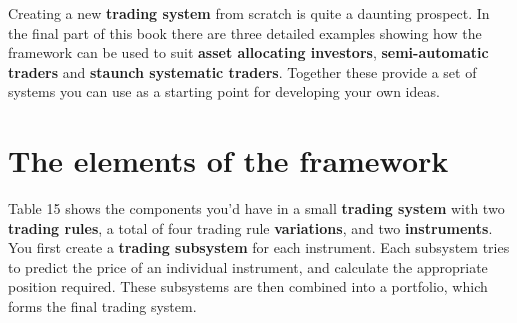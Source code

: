 Creating a new \textbf{trading system} from scratch is quite a daunting prospect. In the final part of this book there are three detailed examples showing how the framework can be used to suit \textbf{asset allocating investors}, \textbf{semi-automatic traders} and \textbf{staunch systematic traders}. Together these provide a set of systems you can use as a starting point for developing your own ideas.

\section*{The elements of the framework}  {}

Table 15 shows the components you'd have in a small \textbf{trading system} with two \textbf{trading rules}, a total of four trading rule \textbf{variations}, and two \textbf{instruments}. You first create a \textbf{trading subsystem} for each instrument. Each subsystem tries to predict the price of an individual instrument, and calculate the appropriate position required. These subsystems are then combined into a portfolio, which forms the final trading system.

